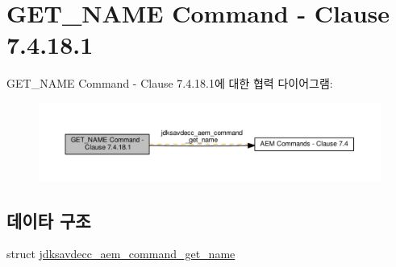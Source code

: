 \hypertarget{group__command__get__name}{}\section{G\+E\+T\+\_\+\+N\+A\+ME Command -\/ Clause 7.4.18.1}
\label{group__command__get__name}
G\+E\+T\+\_\+\+N\+A\+ME Command -\/ Clause 7.4.18.1에 대한 협력 다이어그램\+:
\nopagebreak
\begin{figure}[H]
\begin{center}
\leavevmode
\includegraphics[width=350pt]{group__command__get__name}
\end{center}
\end{figure}
\subsection*{데이타 구조}
\begin{DoxyCompactItemize}
\item 
struct \hyperlink{structjdksavdecc__aem__command__get__name}{jdksavdecc\+\_\+aem\+\_\+command\+\_\+get\+\_\+name}
\end{DoxyCompactItemize}
